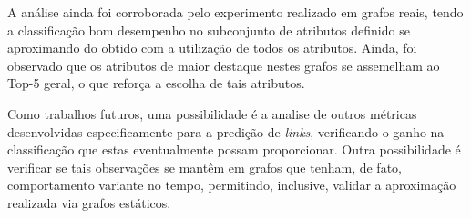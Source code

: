 \documentclass[a4paper,11pt]{article}
\begin{document}
A análise ainda foi corroborada pelo experimento realizado em grafos reais, tendo a classificação bom desempenho no subconjunto de atributos definido se aproximando do obtido com a utilização de todos os atributos. Ainda, foi observado que os atributos de maior destaque nestes grafos se assemelham ao Top-5 geral, o que reforça a escolha de tais atributos.


Como trabalhos futuros, uma possibilidade é a analise de outros métricas desenvolvidas especificamente para a predição de \textit{links}, verificando o ganho na classificação que estas eventualmente possam proporcionar. Outra possibilidade é verificar se tais observações se mantêm em grafos que tenham, de fato, comportamento variante no tempo, permitindo, inclusive, validar a aproximação realizada via grafos estáticos. %

\vspace{0.5cm}
\end{document}
